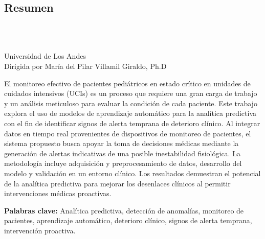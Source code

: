 \begin{titlepage}
  \centering
  \newpage
  \pagestyle{empty}

  \chapter*{Resumen}
  \vspace{0.5cm}

  {\bf\centering \ThesisTitle} \\
  \vspace{0.8cm}

  \begin{flushright}
    \AuthorName \\
    Universidad de Los Andes \\
    Dirigida por María del Pilar Villamil Giraldo, Ph.D
  \end{flushright}

  \vspace{0.8cm}

  \justifying El monitoreo efectivo de pacientes pediátricos en estado crítico en unidades de cuidados intensivos (UCIs) es un proceso que requiere una gran carga de trabajo y un análisis meticuloso para evaluar la condición de cada paciente. Este trabajo explora el uso de modelos de aprendizaje automático para la analítica predictiva con el fin de identificar signos de alerta temprana de deterioro clínico. Al integrar datos en tiempo real provenientes de dispositivos de monitoreo de pacientes, el sistema propuesto busca apoyar la toma de decisiones médicas mediante la generación de alertas indicativas de una posible inestabilidad fisiológica. La metodología incluye adquisición y preprocesamiento de datos, desarrollo del modelo y validación en un entorno clínico. Los resultados demuestran el potencial de la analítica predictiva para mejorar los desenlaces clínicos al permitir intervenciones médicas proactivas.

  \begin{flushleft}
    \vspace{0.5cm}
    \textbf{Palabras clave:} Analítica predictiva, detección de anomalías, monitoreo de pacientes, aprendizaje automático, deterioro clínico, signos de alerta temprana, intervención proactiva.

  \end{flushleft}

\end{titlepage}
